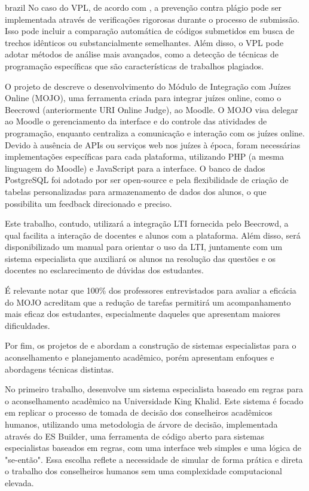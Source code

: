 \begin{otherlanguage*}{brazil}
No caso do VPL, de acordo com \textcite{rodriguezdelpinoandroyo}, a prevenção contra plágio pode ser implementada através de verificações rigorosas durante o processo de submissão. Isso pode incluir a comparação automática de códigos submetidos em busca de trechos idênticos ou substancialmente semelhantes. Além disso, o VPL pode adotar métodos de análise mais avançados, como a detecção de técnicas de programação específicas que são características de trabalhos plagiados.

O projeto de \textcite{joseosvaldochaves} descreve o desenvolvimento do Módulo de Integração com Juízes Online (MOJO), uma ferramenta criada para integrar juízes online, como o Beecrowd (anteriormente URI Online Judge), ao Moodle. O MOJO visa delegar ao Moodle o gerenciamento da interface e do controle das atividades de programação, enquanto centraliza a comunicação e interação com os juízes online. Devido à ausência de APIs ou serviços web nos juízes à época, foram necessárias implementações específicas para cada plataforma, utilizando PHP (a mesma linguagem do Moodle) e JavaScript para a interface. O banco de dados PostgreSQL foi adotado por ser open-source e pela flexibilidade de criação de tabelas personalizadas para armazenamento de dados dos alunos, o que possibilita um feedback direcionado e preciso.

Este trabalho, contudo, utilizará a integração LTI fornecida pelo Beecrowd, a qual facilita a interação de docentes e alunos com a plataforma. Além disso, será disponibilizado um manual para orientar o uso da LTI, juntamente com um sistema especialista que auxiliará os alunos na resolução das questões e os docentes no esclarecimento de dúvidas dos estudantes.

É relevante notar que 100\% dos professores entrevistados para avaliar a eficácia do MOJO acreditam que a redução de tarefas permitirá um acompanhamento mais eficaz dos estudantes, especialmente daqueles que apresentam maiores dificuldades.

Por fim, os projetos de \textcite{osmannasr} e \textcite{neildunstan} abordam a construção de sistemas especialistas para o aconselhamento e planejamento acadêmico, porém apresentam enfoques e abordagens técnicas distintas.

No primeiro trabalho, \textcite{osmannasr} desenvolve um sistema especialista baseado em regras para o aconselhamento acadêmico na Universidade King Khalid. Este sistema é focado em replicar o processo de tomada de decisão dos conselheiros acadêmicos humanos, utilizando uma metodologia de árvore de decisão, implementada através do ES Builder, uma ferramenta de código aberto para sistemas especialistas baseados em regras, com uma interface web simples e uma lógica de "se-então". Essa escolha reflete a necessidade de simular de forma prática e direta o trabalho dos conselheiros humanos sem uma complexidade computacional elevada.


\end{otherlanguage*}
